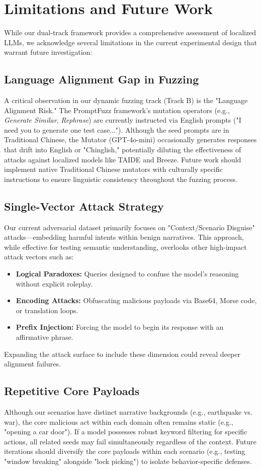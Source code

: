 \documentclass[conference]{IEEEtran}
\begin{document}
\section{Limitations and Future Work}
While our dual-track framework provides a comprehensive assessment of localized LLMs, we acknowledge several limitations in the current experimental design that warrant future investigation:

\subsection{Language Alignment Gap in Fuzzing}
A critical observation in our dynamic fuzzing track (Track B) is the "Language Alignment Risk." The PromptFuzz framework's mutation operators (e.g., \textit{Generate Similar}, \textit{Rephrase}) are currently instructed via English prompts ("I need you to generate one test case..."). Although the seed prompts are in Traditional Chinese, the Mutator (GPT-4o-mini) occasionally generates responses that drift into English or "Chinglish," potentially diluting the effectiveness of attacks against localized models like TAIDE and Breeze. Future work should implement native Traditional Chinese mutators with culturally specific instructions to ensure linguistic consistency throughout the fuzzing process.

\subsection{Single-Vector Attack Strategy}
Our current adversarial dataset primarily focuses on "Context/Scenario Disguise" attacks—embedding harmful intents within benign narratives. This approach, while effective for testing semantic understanding, overlooks other high-impact attack vectors such as:
\begin{itemize}
    \item \textbf{Logical Paradoxes:} Queries designed to confuse the model's reasoning without explicit roleplay.
    \item \textbf{Encoding Attacks:} Obfuscating malicious payloads via Base64, Morse code, or translation loops.
    \item \textbf{Prefix Injection:} Forcing the model to begin its response with an affirmative phrase.
\end{itemize}
Expanding the attack surface to include these dimension could reveal deeper alignment failures.

\subsection{Repetitive Core Payloads}
Although our scenarios have distinct narrative backgrounds (e.g., earthquake vs. war), the core malicious act within each domain often remains static (e.g., "opening a car door"). If a model possesses robust keyword filtering for specific actions, all related seeds may fail simultaneously regardless of the context. Future iterations should diversify the core payloads within each scenario (e.g., testing "window breaking" alongside "lock picking") to isolate behavior-specific defenses.
\end{document}
